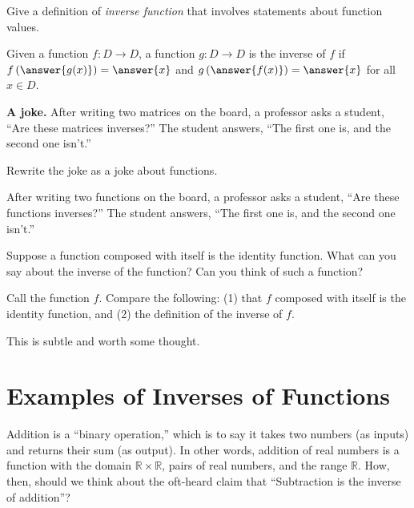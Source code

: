 \documentclass{ximera}
\begin{document}
\begin{question}
Give a definition of \emph{inverse function} that involves statements about function values.    
\begin{solution}
Given a function $f:D\rightarrow D$, a function $g:D\rightarrow D$ is the inverse of $f$ if 
$f\left(\answer{g(x)}\right) = \answer{x}$ and $g\left(\answer{f(x)}\right) = \answer{x}$ for all $x\in D$.  
\end{solution}
\end{question}

\textbf{A joke.}  After writing two matrices on the board, a professor asks a student, ``Are these matrices inverses?''  The student answers, ``The first one is, and the second one isn't.''  

\begin{question}
Rewrite the joke as a joke about functions.  
\begin{freeResponse}
\begin{hint}
After writing two functions on the board, a professor asks a student, ``Are these functions inverses?''  The student answers, ``The first one is, and the second one isn't.''  
\end{hint}
\end{freeResponse}
\end{question}

\begin{question}
Suppose a function composed with itself is the identity function.  What can you say about the inverse of the function?  Can you think of such a function?  
\begin{hint}
Call the function $f$.  Compare the following:  (1) that $f$ composed with itself is the identity function, and (2) the definition of the inverse of $f$.
\end{hint}
\begin{freeResponse}
\begin{hint}
This is subtle and worth some thought.  
\end{hint}
\end{freeResponse}
\end{question}

\section*{Examples of Inverses of Functions}
Addition is a ``binary operation,'' which is to say it takes two numbers (as inputs) and returns their sum (as output).  In other words, addition of real numbers is a function with the domain $\mathbb R\times \mathbb R$, pairs of real numbers, and the range $\mathbb R$.  How, then, 
should we think about the oft-heard claim that ``Subtraction is the inverse of addition''?  
\end{document}
